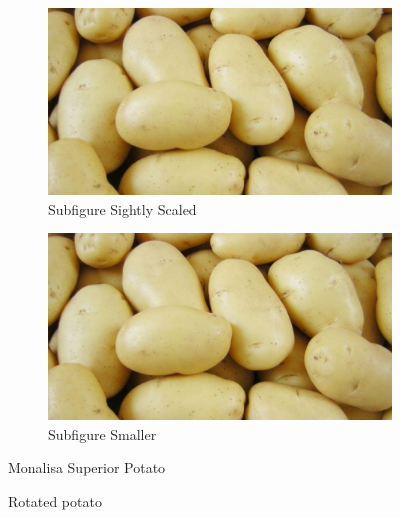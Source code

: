 \begin{figure}[!htbp]
    \centering
    \begin{subfigure}{0.60\textwidth}
        \includegraphics[width=\textwidth]{./figures/potato_monalisa_superior.jpg}
        \caption{Subfigure Sightly Scaled}
    \end{subfigure}
    \hfill
    \begin{subfigure}{0.35\textwidth}
        \includegraphics[width=\textwidth]{./figures/potato_monalisa_superior.jpg}
        \caption{Subfigure Smaller}
    \end{subfigure}
    \caption{Monalisa Superior Potato}
\end{figure}



\begin{figure}[!htbp]
    \centering
    \caption{Rotated potato}
\end{figure}








